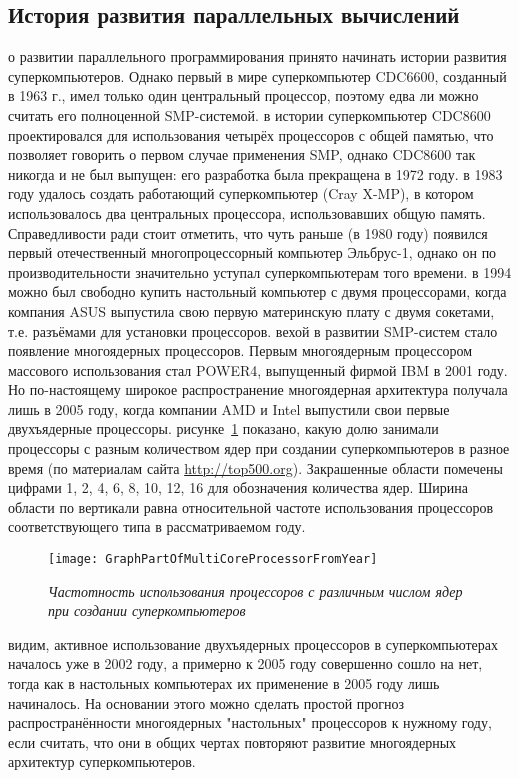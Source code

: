 { %
	\subsection{История развития параллельных вычислений}
	 о развитии параллельного программирования принято начинать истории развития суперкомпьютеров. Однако первый в мире суперкомпьютер CDC6600, созданный в 1963 г., имел только один центральный процессор, поэтому едва ли можно считать его полноценной SMP-системой. 
	 в истории суперкомпьютер CDC8600 проектировался для использования четырёх процессоров с общей памятью, что позволяет говорить о первом случае применения SMP, однако CDC8600 так никогда и не был выпущен: его разработка была прекращена в 1972 году. 
	 в 1983 году удалось создать работающий суперкомпьютер (Cray X-MP), в котором использовалось два центральных процессора, использовавших общую память. Справедливости ради стоит отметить, что чуть раньше (в 1980 году) появился первый отечественный многопроцессорный компьютер Эльбрус-1, однако он по производительности значительно уступал суперкомпьютерам того времени.
	 в 1994 можно был свободно купить настольный компьютер с двумя процессорами, когда компания ASUS выпустила свою первую материнскую плату с двумя сокетами, т.е. разъёмами для установки процессоров.
	 вехой в развитии SMP-систем стало появление многоядерных процессоров. Первым многоядерным процессором массового использования стал POWER4, выпущенный фирмой IBM в 2001 году. Но по-настоящему широкое распространение многоядерная архитектура получала лишь в 2005 году, когда компании AMD и Intel выпустили свои первые двухъядерные процессоры.  
	 рисунке~\ref{GraphPartOfMultiCoreProcessorFromYear:image} показано, какую долю занимали процессоры с разным количеством ядер при создании суперкомпьютеров в разное время (по материалам сайта \url{http://top500.org}). Закрашенные области помечены цифрами 1, 2, 4, 6, 8, 10, 12, 16 для обозначения количества ядер. Ширина области по вертикали равна относительной частоте использования процессоров соответствующего типа в рассматриваемом году.
	\begin{figure}[H]
		\texttt{[image: GraphPartOfMultiCoreProcessorFromYear]}
		\caption{\textit{Частотность использования процессоров с различным числом ядер при создании суперкомпьютеров}}
		\label{GraphPartOfMultiCoreProcessorFromYear:image}
	\end{figure}
	 видим, активное использование двухъядерных процессоров в суперкомпьютерах началось уже в 2002 году, а примерно к 2005 году совершенно сошло на нет, тогда как в настольных компьютерах их применение в 2005 году лишь начиналось. На основании этого можно сделать простой прогноз распространённости многоядерных "настольных" процессоров к нужному году, если считать, что они в общих чертах повторяют развитие многоядерных архитектур суперкомпьютеров.
	\par
}
